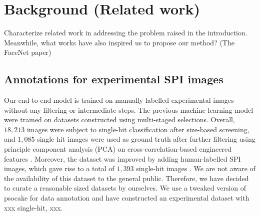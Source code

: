 \section{Background (Related work)}


{
\setlength{\parindent}{4em}
\color{gray} 

\indent Characterize related work in addressing the problem raised in the
introduction. Meanwhile, what works have also inspired us to propose our method?  (The
FaceNet paper)

}

\subsection{Annotations for experimental SPI images}


Our end-to-end model is trained on manually labelled experimental images without
any filtering or intermediate steps.  The previous machine learning model
\cite{ignatenkoClassificationDiffractionPatterns2021} were trained on datasets
constructed using multi-staged selections. Overall, $18,213$ images were subject
to single-hit classification after size-based screening, and $1,085$ single hit
images were used as ground truth after further filtering using principle
component analysis (PCA) on cross-correlation-based engineered features
\cite{roseSingleparticleImagingSymmetry2018}. Moreover, the dataset was improved
by adding human-labelled SPI images, which gave rise to a total of $1,393$
single-hit images \cite{liDiffractionDataAerosolized2020a}.  We are not aware of
the availability of this dataset to the general public.  Therefore, we have
decided to curate a reasonable sized datasets by ourselves. We use a tweaked
version of psocake for data annotation and have constructed an experimental
dataset with {\color{red}xxx} single-hit, {\color{red}xxx}.  


